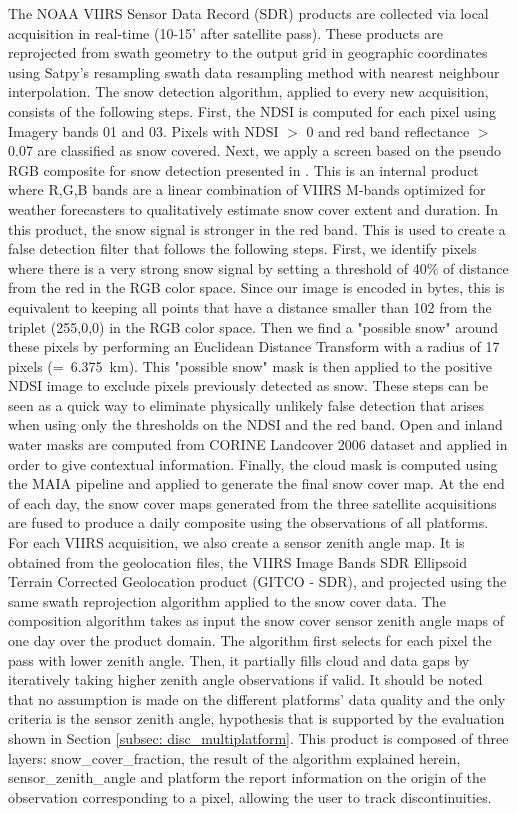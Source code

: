 \documentclass[tc, manuscript]{copernicus}
\begin{document}
The NOAA VIIRS Sensor Data Record (SDR) products are collected via local acquisition in real-time (10-15' after satellite pass). These products are reprojected from swath geometry to the output grid in geographic coordinates using Satpy's resampling \citep{martin_raspaud_2025_17552484} swath data resampling method with nearest neighbour interpolation. The snow detection algorithm, applied to every new acquisition, consists of the following steps. First, the NDSI is computed for each pixel using Imagery bands 01 and 03. Pixels with NDSI $>$ 0 and red band reflectance $>$ 0.07 are classified as snow covered. Next, we apply a screen based on the pseudo RGB composite for snow detection presented in \citep{vidot_daytime_2017}. This is an internal product where R,G,B bands are a linear combination of VIIRS M-bands optimized for weather forecasters to qualitatively estimate snow cover extent and duration. In this product, the snow signal is stronger in the red band. This is used to create a false detection filter that follows the following steps. First, we identify pixels where there is a very strong snow signal by setting a threshold of 40\% of distance from the red in the RGB color space. Since our image is encoded in bytes, this is equivalent to keeping all points that have a distance smaller than 102 from the triplet (255,0,0) in the RGB color space. Then we find a "possible snow" around these pixels by performing an Euclidean Distance Transform with a radius of 17 pixels (=~6.375~km). This "possible snow" mask is then applied to the positive NDSI image to exclude pixels previously detected as snow. These steps can be seen as a quick way to eliminate physically unlikely false detection that arises when using only the thresholds on the NDSI and the red band. Open and inland water masks are computed from CORINE Landcover 2006 dataset and applied in order to give contextual information. Finally, the cloud mask is computed using the MAIA pipeline \citep{lavanat_maia_2018} and applied to generate the final snow cover map. At the end of each day, the snow cover maps generated from the three satellite acquisitions are fused to produce a daily composite using the observations of all platforms. For each VIIRS acquisition, we also create a sensor zenith angle map. It is obtained from the geolocation files, the VIIRS Image Bands SDR Ellipsoid Terrain Corrected Geolocation product (GITCO - SDR), and projected using the same swath reprojection algorithm applied to the snow cover data. The composition algorithm takes as input the snow cover sensor zenith angle maps of one day over the product domain. The algorithm first selects for each pixel the pass with lower zenith angle. Then, it partially fills cloud and data gaps by iteratively taking higher zenith angle observations if valid. It should be noted that no assumption is made on the different platforms' data quality and the only criteria is the sensor zenith angle, hypothesis that is supported by the evaluation shown in Section \ref{subsec: disc_multiplatform}. This product is composed of three layers: snow\_cover\_fraction, the result of the algorithm explained herein, sensor\_zenith\_angle and platform the report information on the origin of the observation corresponding to a pixel, allowing the user to track discontinuities.
\end{document}
